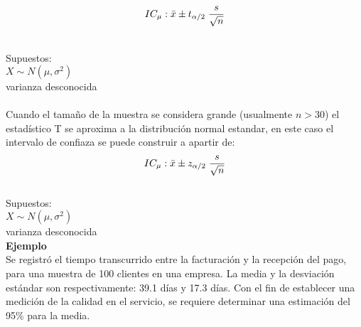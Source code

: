 \documentclass[base=hide,12pt]{elegantbook}
\begin{document}
			$$IC_{\mu}: \bar{x} \pm t_{\alpha/2} \hspace{.1cm}\frac{s}{\sqrt{n}} $$
			
			\\
			Supuestos:\\
			$X\sim N(\mu,\sigma^{2})$\\
			varianza desconocida\\

	\\
	

	Cuando el tamaño de la muestra se considera grande (usualmente $n>30$) el estadístico T se aproxima a la distribución normal estandar, en este caso el intervalo de confiaza se puede construir a apartir de:\\
	

			$$IC_{\mu}: \bar{x} \pm z_{\alpha/2} \hspace{.1cm}\dfrac{s}{\sqrt{n}} $$
			\\
			Supuestos:\\
			$X\sim N(\mu,\sigma^{2})$\\
			varianza desconocida\\

	
\textcolor{col1}{\bf Ejemplo}\\	
 Se registró el tiempo transcurrido entre la facturación y la recepción del pago, para una muestra de 100 clientes en una empresa. La media y la desviación estándar son respectivamente: 39.1 días y 17.3 días. Con el fin de establecer una medición de la calidad en el servicio, se requiere determinar una estimación del 95\% para la media.
\end{document}
